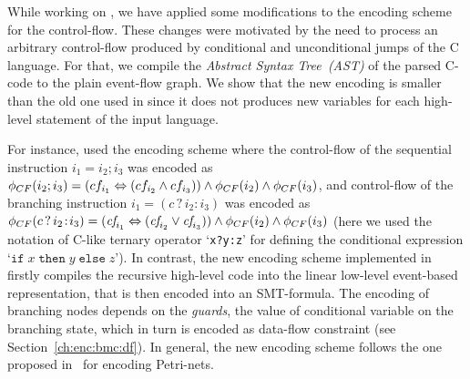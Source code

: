 While working on \porthos[2], we have applied some modifications to the encoding scheme for the control-flow.
These changes were motivated by the need to process an arbitrary control-flow produced by conditional and unconditional jumps of the C language.
For that, we compile the \textit{Abstract Syntax Tree~(AST)} of the parsed C-code to the plain event-flow graph.
We show %
that the new encoding is smaller than the old one used in \porthos{} since it does not produces new variables for each high-level statement of the input language.

For instance, \porthos[1] used the encoding scheme where the control-flow of the sequential instruction $i_1 = i_2; i_3$ was encoded as
$\phi_{CF}(i_2;i_3) = (cf_{i_1} \Leftrightarrow (cf_{i_2} \land cf_{i_3})) \land \phi_{CF}(i_2) \land \phi_{CF}(i_3)$,
and control-flow of the branching instruction $i_1 = (c\,?\,i_2\!:\!i_3)$ was encoded as
$\phi_{CF}(c\,?\,i_2\!:\!i_3) = (\textit{cf}_{i_1} \Leftrightarrow (\textit{cf}_{i_2} \lor \textit{cf}_{i_3})) \land \phi_{CF}(i_2) \land \phi_{CF}(i_3)$
(here we used the notation of C-like ternary operator `\texttt{x?y:z}' for defining the conditional expression `$\texttt{if}\;x\;\texttt{then}\;y\;\texttt{else}\;z$').
In contrast, the new encoding scheme implemented in \porthos[2] firstly compiles the recursive high-level code into the linear low-level event-based representation, that is then encoded into an SMT-formula. The encoding of branching nodes depends on the \textit{guards}, the value of conditional variable on the branching state, which in turn is encoded as data-flow constraint (see Section~\ref{ch:enc:bmc:df}).
In general, the new encoding scheme follows the one proposed in~\cite[Chapter 5.1.2]{heljanko2008unfoldings} for encoding Petri-nets.


